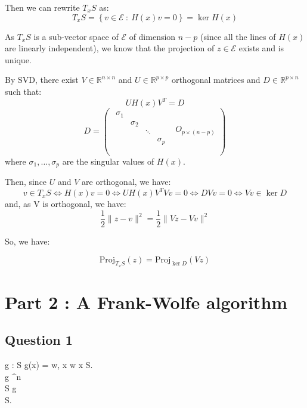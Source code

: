 \documentclass[12p]{article}
\newcommand*{\proj}{\text{Proj}}
\newcommand*{\es}{\mathcal{E}}
\begin{document}
Then we can rewrite \(T_xS\) as:
\[
  T_xS=\left\{v\in \es \ : \ H(x)v=0\right\} =\ker H(x)  
\]

As \(T_xS\) is a sub-vector space of \(\es\) of dimension \(n-p\) (since all the lines of \(H(x)\) are linearly independent), we know that the projection of \(z\in \es\) exists and is unique. 

By SVD, there exist \(V\in\mathbb{R}^{n\times n}\) and \(U\in\mathbb{R}^{p\times p}\) orthogonal matrices and \(D\in\mathbb{R}^{p\times n}\) such that:
\[
  UH(x)V^T=D
\]
\[
  D=\begin{pmatrix}
    \begin{matrix}
    \sigma_1 &  &  & \\
     & \sigma_2 &  & \\
     &  & \ddots & \\
     &  &  & \sigma_p\\
    \end{matrix} & O_{p\times(n-p)}\\
    \end{pmatrix}  
\]
where \(\sigma_1,\dots,\sigma_p\) are the singular values of \(H(x)\).

Then, since \(U\) and \(V\) are orthogonal, we have:
\[
  v\in T_xS\iff H(x)v=0\iff UH(x)V^TVv=0\iff DVv=0\iff Vv\in \ker D  
\]
and, as V is orthogonal, we have:
\[
  \frac{1}{2}\|z-v\|^2= \frac{1}{2}\|Vz-Vv\|^2  
\]

So, we have:

\[
  \proj_{T_xS}(z)= \proj_{\ker D}(Vz) 
\]

\newpage


\section*{Part 2 : A Frank-Wolfe algorithm} 


\subsection*{Question 1} 
 g : S \rightarrow {}  g(x) = \langle w, x \rangle {} w  x \in S. \\
 g  ^n  \\
 S  g  \\
 S.
\end{document}

